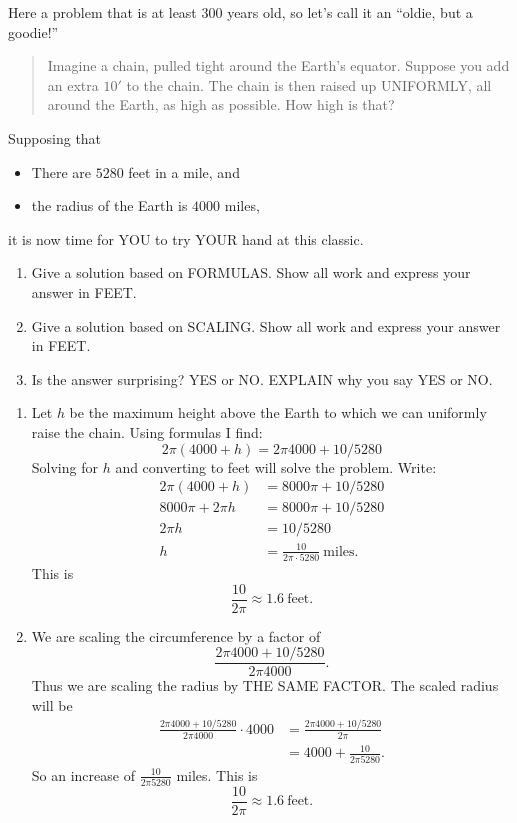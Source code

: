 \documentclass[noauthor,nooutcomes,handout]{ximera}
\begin{document}
\begin{question}
  Here a problem that is at least $300$ years old, so let's call it an
  ``oldie, but a goodie!''
  \begin{quote}
    Imagine a chain, pulled tight around the Earth's equator. Suppose
    you add an extra $10'$ to the chain. The chain is then raised up
    UNIFORMLY, all around the Earth, as high as possible. How high is
    that?
  \end{quote}
  Supposing that
  \begin{itemize}
  \item There are $5280$ feet in a mile, and
  \item the radius of the Earth is $4000$ miles,
  \end{itemize}
  it is now time for YOU to try YOUR hand at this classic.
  \begin{enumerate}
  \item Give a solution based on FORMULAS. Show all work and express
    your answer in FEET.
  \item Give a solution based on SCALING. Show all work and express
    your answer in FEET.
  \item Is the answer surprising? YES or NO. EXPLAIN why you say YES or
    NO.
  \end{enumerate}
  \begin{freeResponse}
    \begin{enumerate}
    \item Let $h$ be the maximum height above the Earth to which we
      can uniformly raise the chain. Using formulas I find:
      \[
      2\pi(4000 + h) = 2\pi 4000 + 10/5280
      \]
      Solving for $h$ and converting to feet will solve the
      problem. Write:
      \begin{align*}
        2\pi(4000 + h) &= 8000\pi + 10/5280 \\
        8000\pi + 2\pi h &= 8000\pi + 10/5280\\
        2\pi h &= 10/5280\\
        h &= \frac{10}{2\pi \cdot 5280}~\text{miles}.
      \end{align*}
      This is
      \[
      \frac{10}{2\pi}\approx 1.6~\text{feet}.
      \]
    \item We are scaling the circumference by a factor of
      \[
      \frac{2\pi 4000 + 10/5280}{2\pi 4000}.
      \]
      Thus we are scaling the radius by THE SAME FACTOR. The scaled
      radius will be
      \begin{align*}
        \frac{2\pi 4000 + 10/5280}{2\pi 4000}\cdot 4000 &= \frac{2\pi 4000 + 10/5280}{2\pi}\\
        &=  4000 +  \frac{10}{2\pi5280}.
      \end{align*}
      So an increase of $\frac{10}{2\pi5280}$ miles. This is
      \[
      \frac{10}{2\pi}\approx 1.6~\text{feet}.
      \]
      

\end{enumerate}
\end{freeResponse}
\end{question}
\end{document}
